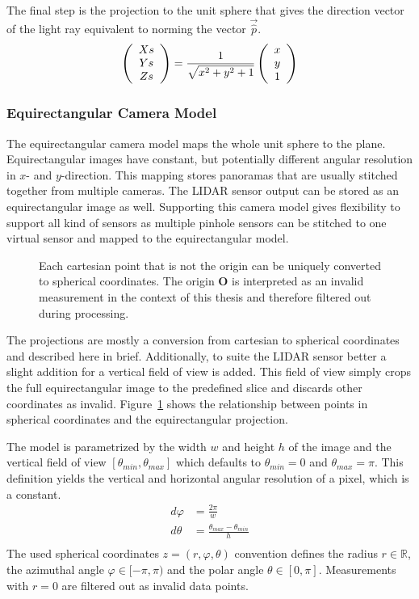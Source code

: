 The final step is the projection to the unit sphere that gives the direction vector of the light ray equivalent to norming the vector $\vec{\hat{p}}$.
\begin{equation}
    \left(\begin{array}{c} Xs \\ Ys \\ Zs \end{array}\right) = \frac{1}{\sqrt{x^2 + y^2 + 1}} \left(\begin{array}{c} x \\ y \\ 1 \end{array}\right)
    \label{eq:pinhole_backward}
\end{equation}

\subsubsection{Equirectangular Camera Model}

The equirectangular camera model maps the whole unit sphere to the plane.
Equirectangular images have constant, but potentially different angular resolution in $x$- and $y$-direction.
This mapping stores panoramas that are usually stitched together from multiple cameras.
The \acrshort{LIDAR} sensor output can be stored as an equirectangular image as well.
Supporting this camera model gives flexibility to support all kind of sensors as multiple pinhole sensors can be stitched to one virtual sensor and mapped to the equirectangular model.

\begin{figure}[H]
    \scalebox{0.9}{%
    
    }
    \caption{Each cartesian point that is not the origin can be uniquely converted to spherical coordinates. The origin $\mathbf{O}$ is interpreted as an invalid measurement in the context of this thesis and therefore filtered out during processing.}\label{fig:spherical}
\end{figure}

The projections are mostly a conversion from cartesian to spherical coordinates and described here in brief.
Additionally, to suite the \acrshort{LIDAR} sensor better a slight addition for a vertical field of view is added.
This field of view simply crops the full equirectangular image to the predefined slice and discards other coordinates as invalid.
Figure~\ref{fig:spherical} shows the relationship between points in spherical coordinates and the equirectangular projection.

The model is parametrized by the width $w$ and height $h$ of the image and the vertical field of view $[\theta_{min}, \theta_{max}]$ which defaults to $\theta_{min} = 0$ and $\theta_{max} = \pi$.
This definition yields the vertical and horizontal angular resolution of a pixel, which is a constant.
\begin{equation}
\label{eq:equi_angular_resolution}
\begin{aligned}
    d\varphi &= \frac{2 \pi}{w} \\
    d\theta &= \frac{\theta_{max} - \theta_{min}}{h} \\
\end{aligned}
\end{equation}
The used spherical coordinates $z = (r, \varphi, \theta)$ convention defines the radius $r \in \mathbb{R}$, the azimuthal angle $\varphi \in [-\pi, \pi)$ and the polar angle $\theta \in [0, \pi]$.
Measurements with $r = 0$ are filtered out as invalid data points.

